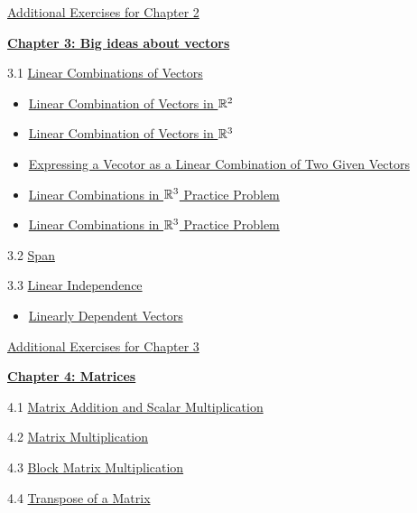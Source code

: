 \documentclass{ximera}
\begin{document}
\href{https://ximera.osu.edu/oerlinalg/LinearAlgebra/SUPX-0020/main}{Additional Exercises for Chapter 2}
	
\href{https://ximera.osu.edu/oerlinalg/LinearAlgebra/XLAChapter_bigIdeas/main}{\textbf{Chapter 3: Big ideas about vectors}}
	
3.1	\href{https://ximera.osu.edu/oerlinalg/LinearAlgebra/VEC-0040/main}{Linear Combinations of Vectors}
\begin{itemize}
    \item 
    \href{https://www.geogebra.org/m/md3srgdg}{Linear Combination of Vectors in $\mathbb{R}^2$}
    \item
    \href{https://www.geogebra.org/m/zvzxujp2}{Linear Combination of Vectors in $\mathbb{R}^3$}
    \item
    \href{https://www.geogebra.org/m/u77b52k8}{Expressing a Vecotor as a Linear Combination of Two Given Vectors}
    \item
    \href{https://www.geogebra.org/m/kk5hwjka}{Linear Combinations in $\mathbb{R}^3$ Practice Problem}
    \item
    \href{https://www.geogebra.org/m/x9f6qnyr}{Linear Combinations in $\mathbb{R}^3$ Practice Problem}
\end{itemize}
	
3.2	\href{https://ximera.osu.edu/oerlinalg/LinearAlgebra/VEC-0090/main}{Span}
	
3.3	\href{https://ximera.osu.edu/oerlinalg/LinearAlgebra/VEC-0100/main}{Linear Independence}
\begin{itemize}
    \item 
    \href{https://www.geogebra.org/m/x72vbsaw}{Linearly Dependent Vectors}
\end{itemize}
	
\href{https://ximera.osu.edu/oerlinalg/LinearAlgebra/SUPX-0030/main}{Additional Exercises for Chapter 3}
	
\href{https://ximera.osu.edu/oerlinalg/LinearAlgebra/XLAChapter_matrices/main}{\textbf{Chapter 4: Matrices}}
	
4.1	\href{https://ximera.osu.edu/oerlinalg/LinearAlgebra/MAT-0010/main}{Matrix Addition and Scalar Multiplication}
	
4.2	\href{https://ximera.osu.edu/oerlinalg/LinearAlgebra/MAT-0020/main}{Matrix Multiplication}
	
4.3	\href{https://ximera.osu.edu/oerlinalg/LinearAlgebra/MAT-0023/main}{Block Matrix Multiplication}
	
4.4	\href{https://ximera.osu.edu/oerlinalg/LinearAlgebra/MAT-0025/main}{Transpose of a Matrix}
	
\end{document}
